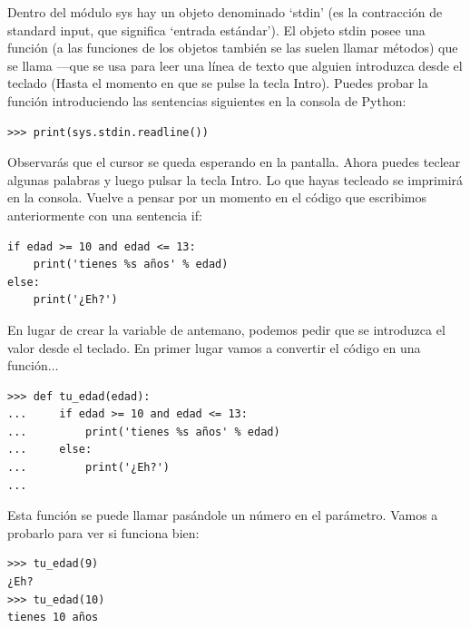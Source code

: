 Dentro del módulo sys hay un objeto denominado `stdin' (es la contracción de standard input, que significa `entrada estándar').  El objeto stdin posee una función (a las funciones de los objetos también se las suelen llamar métodos) que se llama ---que se usa para leer una línea de texto que alguien introduzca desde el teclado (Hasta el momento en que se pulse la tecla Intro).  Puedes probar la función  introduciendo las sentencias siguientes en la consola de Python:

\begin{listing}
\begin{verbatim}
>>> print(sys.stdin.readline())
\end{verbatim}
\end{listing}

Observarás que el cursor se queda esperando en la pantalla. Ahora puedes teclear algunas palabras y luego pulsar la tecla Intro. Lo que hayas tecleado se imprimirá en la consola.  Vuelve a pensar por un momento en el código que escribimos anteriormente con una sentencia if:

\begin{listing}
\begin{verbatim}
if edad >= 10 and edad <= 13:
    print('tienes %s años' % edad)
else:
    print('¿Eh?')
\end{verbatim}
\end{listing}

En lugar de crear la variable  de antemano, podemos pedir que se introduzca el valor desde el teclado.  En primer lugar vamos a convertir el código en una función$\ldots$

\begin{listing}
\begin{verbatim}
>>> def tu_edad(edad):
...     if edad >= 10 and edad <= 13:
...         print('tienes %s años' % edad)
...     else:
...         print('¿Eh?')
... 
\end{verbatim}
\end{listing}

Esta función se puede llamar pasándole un número en el parámetro. Vamos a probarlo para ver si funciona bien:

\begin{listing}
\begin{verbatim}
>>> tu_edad(9)
¿Eh?
>>> tu_edad(10)
tienes 10 años
\end{verbatim}
\end{listing}

